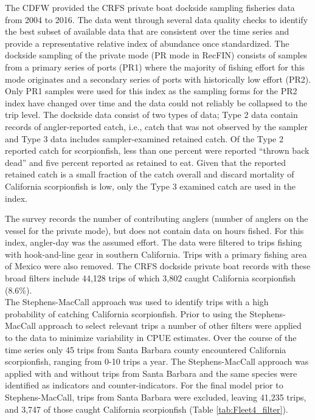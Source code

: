 \documentclass[12pt,]{article}
\begin{document}
The CDFW provided the CRFS private boat dockside sampling fisheries data
from 2004 to 2016. The data went through several data quality checks to
identify the best subset of available data that are consistent over the
time series and provide a representative relative index of abundance
once standardized. The dockside sampling of the private mode (PR mode in
RecFIN) consists of samples from a primary series of ports (PR1) where
the majority of fishing effort for this mode originates and a secondary
series of ports with historically low effort (PR2). Only PR1 samples
were used for this index as the sampling forms for the PR2 index have
changed over time and the data could not reliably be collapsed to the
trip level. The dockside data consist of two types of data; Type 2 data
contain records of angler-reported catch, i.e., catch that was not
observed by the sampler and Type 3 data includes sampler-examined
retained catch. Of the Type 2 reported catch for scorpionfish, less than
one percent were reported ``thrown back dead'' and five percent reported
as retained to eat. Given that the reported retained catch is a small
fraction of the catch overall and discard mortality of California
scorpionfish is low, only the Type 3 examined catch are used in the
index.

The survey records the number of contributing anglers (number of anglers
on the vessel for the private mode), but does not contain data on hours
fished. For this index, angler-day was the assumed effort. The data were
filtered to trips fishing with hook-and-line gear in southern
California. Trips with a primary fishing area of Mexico were also
removed. The CRFS dockside private boat records with these broad filters
include 44,128 trips of which 3,802 caught California scorpionfish
(8.6\%).\\
The Stephens-MacCall approach was used to identify trips with a high
probability of catching California scorpionfish. Prior to using the
Stephens-MacCall approach to select relevant trips a number of other
filters were applied to the data to minimize variability in CPUE
estimates. Over the course of the time series only 45 trips from Santa
Barbara county encountered California scorpionfish, ranging from 0-10
trips a year. The Stephens-MacCall approach was applied with and without
trips from Santa Barbara and the same species were identified as
indicators and counter-indicators. For the final model prior to
Stephens-MacCall, trips from Santa Barbara were excluded, leaving 41,235
trips, and 3,747 of those caught California scorpionfish (Table
\ref{tab:Fleet4_filter}).
\end{document}
